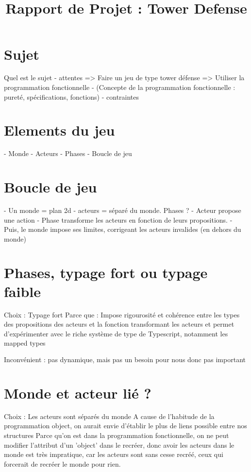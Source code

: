 \documentclass{article}
\title{Rapport de Projet : Tower Defense}
\begin{document}
\maketitle

\section{Sujet}
Quel est le sujet
- attentes
 => Faire un jeu de type tower défense
 => Utiliser la programmation fonctionnelle
    - (Concepte de la programmation fonctionnelle : pureté, spécifications, fonctions)
- contraintes


\section{Elements du jeu}
- Monde
- Acteurs
- Phases
- Boucle de jeu

\section{Boucle de jeu}
- Un monde = plan 2d
- acteurs = séparé du monde.
Phases ? 
 - Acteur propose une action
 - Phase transforme les acteurs en fonction de leurs propositions.
 - Puis, le monde impose ses limites, corrigeant les acteurs invalides (en dehors du monde)


\section{Phases, typage fort ou typage faible}
Choix : Typage fort
Parce que : Impose rigourosité et cohérence entre les types des propositions des 
acteurs et la fonction transformant les acteurs et permet d'expérimenter avec 
le riche système de type de Typescript, notamment les mapped types

Inconvénient : pas dynamique, mais pas un besoin pour nous donc pas important

\section{Monde et acteur lié ?}
Choix : Les acteurs sont séparés du monde
A cause de l'habitude de la programmation object, on aurait envie d'établir le plus de liens possible entre nos structures
Parce qu'on est dans la programmation fonctionnelle, on ne peut modifier l'attribut d'un 'object' dans le recréer, 
donc avoir les acteurs dans le monde est très impratique, car les acteurs sont sans cesse recréé, ceux qui forcerait de 
recréer le monde pour rien.
\end{document}
